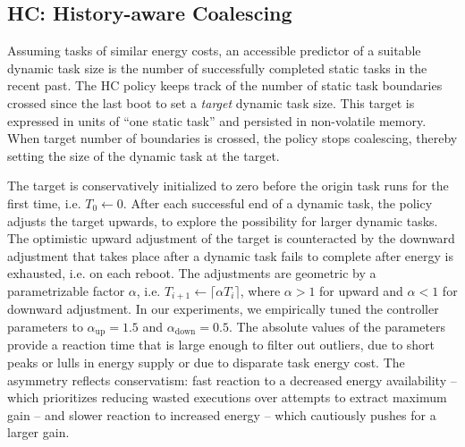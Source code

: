 

\subsection{HC: History-aware Coalescing}

Assuming tasks of similar energy costs, an accessible predictor of a
suitable dynamic task size is the number of successfully completed static tasks
in the recent past.
%
The HC policy keeps track of the number of static task boundaries crossed since
the last boot to set a \emph{target} dynamic task size.
%
This target is expressed in units of ``one static task'' and persisted in
non-volatile memory.
%
When target number of boundaries is crossed, the policy stops coalescing,
thereby setting the size of the dynamic task at the target.

The target is conservatively initialized to zero before the origin task runs
for the first time, i.e. $T_0 \gets 0$.
%
After each successful end of a dynamic task, the policy adjusts the target
upwards, to explore the possibility for larger dynamic tasks.
%
The optimistic upward adjustment of the target is counteracted by the downward
adjustment that takes place after a dynamic task fails to complete after energy
is exhausted, i.e. on each reboot.
%
The adjustments are geometric by a parametrizable factor $\alpha$, i.e.
$T_{i+1} \gets \lceil \alpha T_i \rceil$, where $\alpha  >
1$ for upward and $\alpha < 1$ for downward adjustment.
%
In our experiments, we empirically tuned the controller parameters to $\alpha_\text{up} =
1.5$ and $\alpha_\text{down} = 0.5$.
%
The absolute values of the parameters provide a reaction time that is large
enough to filter out outliers, due to short peaks or lulls in energy supply or
due to disparate task energy cost.
%
The asymmetry reflects conservatism: fast reaction to a decreased energy
availability -- which prioritizes reducing wasted executions over attempts to
extract maximum gain -- and slower reaction to increased energy -- which
cautiously pushes for a larger gain.

